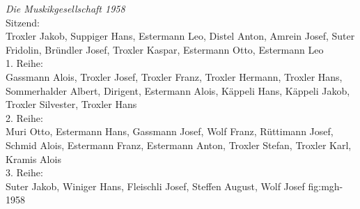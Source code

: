 \begin{figure}[ht]
    \hfil
\end{figure}

{\emph{Die Muskikgesellschaft 1958}\\
    Sitzend:\\
    Troxler Jakob, Suppiger Hans, Estermann Leo, Distel Anton, Amrein Josef,
    Suter Fridolin, Bründler Josef, Troxler Kaspar, Estermann Otto, Estermann
    Leo\\
    1. Reihe:\\
    Gassmann Alois, Troxler Josef, Troxler Franz, Troxler Hermann, Troxler Hans,
    Sommerhalder Albert, Dirigent, Estermann Alois, Käppeli Hans, Käppeli Jakob,
    Troxler Silvester, Troxler Hans\\
    2. Reihe:\\
    Muri Otto, Estermann Hans, Gassmann Josef, Wolf Franz, Rüttimann Josef,
    Schmid Alois, Estermann Franz, Estermann Anton, Troxler Stefan, Troxler
    Karl, Kramis Alois\\
    3. Reihe:\\
    Suter Jakob, Winiger Hans, Fleischli Josef, Steffen August, Wolf Josef }
{fig:mgh-1958}

\clearpage

